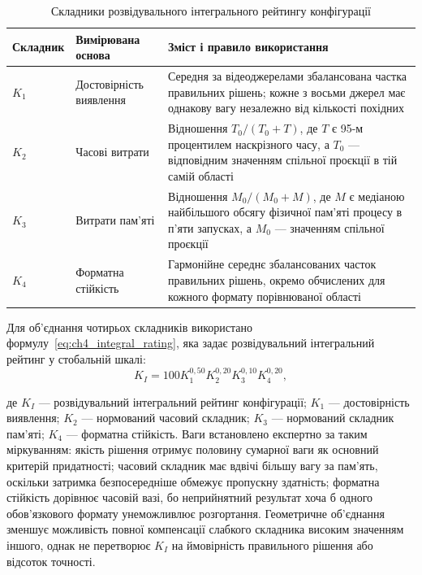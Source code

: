 \begin{table}[htbp]
\caption{Складники розвідувального інтегрального рейтингу конфігурації}
\label{tab:ch4_integral_components}
\centering
\small
\begin{tabularx}{\textwidth}{p{}p{}Y}
\toprule
Складник & Вимірювана основа & Зміст і правило використання \\
\midrule
$K_1$ & Достовірність виявлення & Середня за відеоджерелами збалансована частка правильних рішень; кожне з восьми джерел має однакову вагу незалежно від кількості похідних \\
$K_2$ & Часові витрати & Відношення $T_0/(T_0+T)$, де $T$ є 95-м процентилем наскрізного часу, а $T_0$ --- відповідним значенням спільної проєкції в тій самій області \\
$K_3$ & Витрати пам’яті & Відношення $M_0/(M_0+M)$, де $M$ є медіаною найбільшого обсягу фізичної пам’яті процесу в п’яти запусках, а $M_0$ --- значенням спільної проєкції \\
$K_4$ & Форматна стійкість & Гармонійне середнє збалансованих часток правильних рішень, окремо обчислених для кожного формату порівнюваної області \\
\bottomrule
\end{tabularx}
\end{table}

Для об’єднання чотирьох складників використано формулу~\eqref{eq:ch4_integral_rating}, яка задає розвідувальний інтегральний рейтинг у стобальній шкалі:
\begin{equation}
K_I=100K_1^{0{,}50}K_2^{0{,}20}K_3^{0{,}10}K_4^{0{,}20},
\label{eq:ch4_integral_rating}
\end{equation}

де $K_I$ --- розвідувальний інтегральний рейтинг конфігурації; $K_1$ --- достовірність виявлення; $K_2$ --- нормований часовий складник; $K_3$ --- нормований складник пам’яті; $K_4$ --- форматна стійкість. Ваги встановлено експертно за таким міркуванням: якість рішення отримує половину сумарної ваги як основний критерій придатності; часовий складник має вдвічі більшу вагу за пам’ять, оскільки затримка безпосередніше обмежує пропускну здатність; форматна стійкість дорівнює часовій вазі, бо неприйнятний результат хоча б одного обов’язкового формату унеможливлює розгортання. Геометричне об’єднання зменшує можливість повної компенсації слабкого складника високим значенням іншого, однак не перетворює $K_I$ на ймовірність правильного рішення або відсоток точності.

